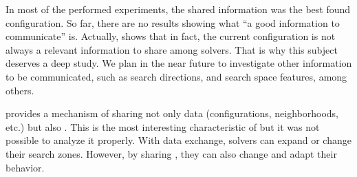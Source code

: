In most of the performed experiments, the shared information was the best found configuration. So far, there are no results showing what ``a good information to communicate'' is. Actually, \cite{Caniou14} shows that in fact, the current configuration is not always a relevant information to share among solvers. That is why this subject deserves a deep study. We plan in the near future to investigate other information to be communicated, such as search directions, and search space features, among others.

\posl{} provides a mechanism of sharing not only data (\ie configurations, neighborhoods, etc.) but also \oms{}. This is the most interesting characteristic of \posl{} but it was not possible to analyze it properly. With data exchange, solvers can expand or change their search zones. However, by sharing \ms{}, they can also change and adapt their behavior. %